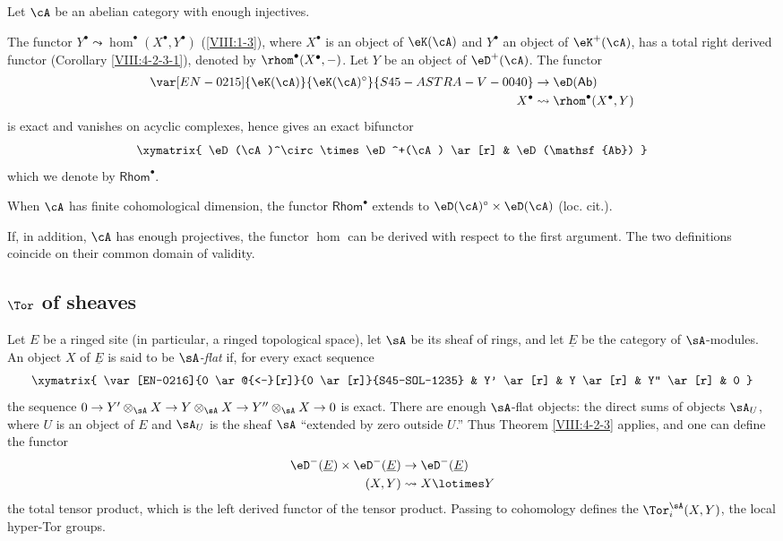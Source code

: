 Let $\cA$ be an abelian category with enough injectives.

The functor $Y^\bullet\leadsto \hom^\bullet(X^\bullet,Y^\bullet)$
(\ref{VIII:1-3}), where $X^\bullet$ is an object of $\eK(\cA)$ and
$Y^\bullet$ an object of $\eK^+(\cA)$, has a total right derived functor
(Corollary \ref{VIII:4-2-3-1}), denoted by
$\rhom^\bullet(X^\bullet,-)$. Let $Y$ be an object of $\eD^+(\cA)$.
The functor
\begin{align*}
  \var[EN-0215]{\eK(\cA)}{\eK(\cA)^\circ}{S45-ASTRA-V-0040} &\to \eD(\mathsf{Ab}) \\
  X^\bullet &\leadsto \rhom^\bullet(X^\bullet,Y)
\end{align*}
is exact and vanishes on acyclic complexes, hence gives an exact
bifunctor
\[\xymatrix{
  \eD(\cA)^\circ \times \eD^+(\cA) \ar[r]
    & \eD(\mathsf{Ab})
}\]
which we denote by $\mathsf{Rhom}^\bullet$.

When $\cA$ has finite cohomological dimension, the functor
$\mathsf{Rhom}^\bullet$ extends to
$\eD(\cA)^\circ\times \eD(\cA)$ (loc. cit.).

If, in addition, $\cA$ has enough projectives, the functor $\hom$ can be
derived with respect to the first argument. The two definitions coincide
on their common domain of validity.

\subsection{\texorpdfstring{$\Tor$}{Tor} of sheaves}\label{VIII:6-2}

Let $E$ be a ringed site (in particular, a ringed topological space), let
$\sA$ be its sheaf of rings, and let $\underline E$ be the category of
$\sA$-modules. An object $X$ of $\underline E$ is said to be
\emph{$\sA$-flat} if, for every exact sequence
\[\xymatrix{
  \var[EN-0216]{0 \ar@{<-}[r]}{0 \ar[r]}{S45-SOL-1235}
    & Y' \ar[r]
    & Y \ar[r]
    & Y'' \ar[r]
    & 0
}\]
the sequence
$0 \to Y'\otimes_\sA X \to Y\otimes_\sA X \to Y''\otimes_\sA X\to 0$
is exact. There are enough $\sA$-flat objects: the direct sums of objects
$\sA_U$, where $U$ is an object of $E$ and $\sA_U$ is the sheaf $\sA$
“extended by zero outside $U$.” Thus Theorem \ref{VIII:4-2-3} applies,
and one can define the functor
\begin{align*}
  \eD^-(\underline E) \times \eD^-(\underline E) &\to \eD^-(\underline E) \\
  (X,Y) &\leadsto X\lotimes Y
\end{align*}
the total tensor product, which is the left derived functor of the tensor
product. Passing to cohomology defines the $\Tor_i^\sA(X,Y)$, the local
hyper-Tor groups.


